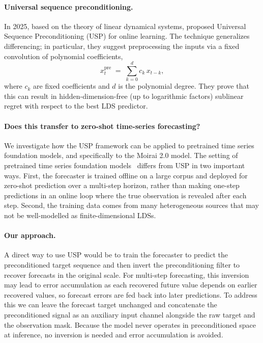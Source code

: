 \documentclass{article}
\begin{document}
\paragraph{Universal sequence preconditioning.} In 2025, based on the theory of linear dynamical systems, \citet{marsden2024universal} proposed Universal Sequence Preconditioning (USP) for online learning. The technique generalizes differencing; in particular, they suggest preprocessing the inputs via a fixed convolution of polynomial coefficients,
\[
x_t^{\mathrm{pre}} \;=\; \sum_{k=0}^{d} c_k\,x_{t-k},
\]
where $c_k$ are fixed coefficients and $d$ is the polynomial degree. They prove that this can result in hidden-dimension-free (up to logarithmic factors) sublinear regret with respect to the best LDS predictor.

\paragraph{Does this transfer to zero-shot time-series forecasting?} We investigate how the USP framework can be applied to pretrained time series foundation models, and specifically to the Moirai 2.0 model. The setting of pretrained time series foundation models~\citep{woo2024unified,liu2024moirai2,das2024decoder,ansari2024chronos,goswami2024moment,auer2025tirex} differs from USP in two important ways. First, the forecaster is trained offline on a large corpus and deployed for zero-shot prediction over a multi-step horizon, rather than making one-step predictions in an online loop where the true observation is revealed after each step. Second, the training data comes from many heterogeneous sources that may not be well-modelled as finite-dimensional LDSs.

\paragraph{Our approach.}
A direct way to use USP would be to train the forecaster to predict the preconditioned target sequence and
then invert the preconditioning filter to recover forecasts in the original scale. For multi-step
forecasting, this inversion may lead to error accumulation as each recovered future value depends on earlier recovered
values, so forecast errors are fed back into later predictions. To address this we can leave the forecast target unchanged and concatenate the preconditioned signal as an auxiliary input channel alongside the raw target and the observation mask. Because the model never operates in preconditioned space at inference, no inversion is needed and error accumulation is avoided.
\end{document}
